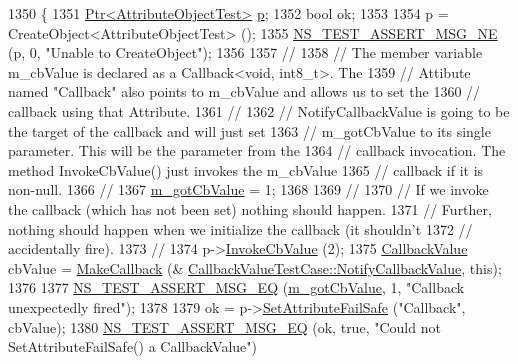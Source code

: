 \begin{DoxyCode}
1350 \{
1351   \hyperlink{classns3_1_1Ptr}{Ptr<AttributeObjectTest>} \hyperlink{lte__link__budget_8m_ac9de518908a968428863f829398a4e62}{p};
1352   \textcolor{keywordtype}{bool} ok;
1353 
1354   p = CreateObject<AttributeObjectTest> ();
1355   \hyperlink{group__testing_ga73d66fb0050a5111453fd144e767b91a}{NS\_TEST\_ASSERT\_MSG\_NE} (p, 0, \textcolor{stringliteral}{"Unable to CreateObject"});
1356 
1357   \textcolor{comment}{//}
1358   \textcolor{comment}{// The member variable m\_cbValue is declared as a Callback<void, int8\_t>.  The}
1359   \textcolor{comment}{// Attibute named "Callback" also points to m\_cbValue and allows us to set the}
1360   \textcolor{comment}{// callback using that Attribute.}
1361   \textcolor{comment}{//}
1362   \textcolor{comment}{// NotifyCallbackValue is going to be the target of the callback and will just set}
1363   \textcolor{comment}{// m\_gotCbValue to its single parameter.  This will be the parameter from the}
1364   \textcolor{comment}{// callback invocation.  The method InvokeCbValue() just invokes the m\_cbValue }
1365   \textcolor{comment}{// callback if it is non-null.}
1366   \textcolor{comment}{//}
1367   \hyperlink{classCallbackValueTestCase_ae6264f15f1300b741d5ca583de995623}{m\_gotCbValue} = 1;
1368 
1369   \textcolor{comment}{//}
1370   \textcolor{comment}{// If we invoke the callback (which has not been set) nothing should happen.}
1371   \textcolor{comment}{// Further, nothing should happen when we initialize the callback (it shouldn't}
1372   \textcolor{comment}{// accidentally fire).}
1373   \textcolor{comment}{//}
1374   p->\hyperlink{classAttributeObjectTest_a72d121c08578e08d02bae4a72231e925}{InvokeCbValue} (2);
1375   \hyperlink{classns3_1_1CallbackValue}{CallbackValue} cbValue = \hyperlink{group__makecallbackmemptr_ga9376283685aa99d204048d6a4b7610a4}{MakeCallback} (&
      \hyperlink{classCallbackValueTestCase_a19136cc6424c7a2f51b21481d1832902}{CallbackValueTestCase::NotifyCallbackValue}, \textcolor{keyword}{this});
1376 
1377   \hyperlink{group__testing_ga2a9d78cffb3db8e867c35fff0b698cf5}{NS\_TEST\_ASSERT\_MSG\_EQ} (\hyperlink{classCallbackValueTestCase_ae6264f15f1300b741d5ca583de995623}{m\_gotCbValue}, 1, \textcolor{stringliteral}{"Callback unexpectedly fired"});
1378 
1379   ok = p->\hyperlink{classns3_1_1ObjectBase_aa7d333004e970f925a4ed5df275541b5}{SetAttributeFailSafe} (\textcolor{stringliteral}{"Callback"}, cbValue);
1380   \hyperlink{group__testing_ga2a9d78cffb3db8e867c35fff0b698cf5}{NS\_TEST\_ASSERT\_MSG\_EQ} (ok, \textcolor{keyword}{true}, \textcolor{stringliteral}{"Could not SetAttributeFailSafe() a CallbackValue"})

\end{DoxyCode}
